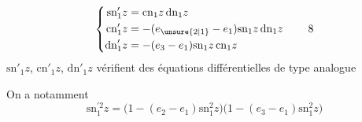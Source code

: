 \[
\left\{\begin{aligned}
\mathrm{sn}'_1z&=\mathrm{cn}_1z\,\mathrm{dn}_1z\\
\mathrm{cn}'_1z&=-(e_{\unsure{2|1}}-e_1)\mathrm{sn}_1z\,\mathrm{dn}_1z\\
\mathrm{dn}'_1z&=-(e_3-e_1)\mathrm{sn}_1z\,\mathrm{cn}_1z
\end{aligned}\right.\tag*{8}
\]
$\mathrm{sn}'_1z$, $\mathrm{cn}'_1z$, $\mathrm{dn}'_1z$ vérifient des équations différentielles de type analogue

On a notamment
\[
\mathrm{sn}_1^{\prime 2}z=\bigl(1-(e_2-e_1)\mathrm{sn}_1^2z\bigr)
\bigl(1-(e_3-e_1)\mathrm{sn}_1^2z\bigr)\tag*{(9)}
\]

